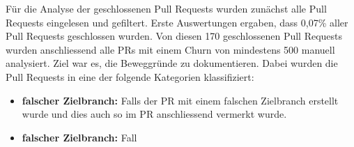 Für die Analyse der geschlossenen Pull Requests wurden zunächst alle Pull Requests eingelesen und gefiltert. Erste Auswertungen ergaben, dass 0,07\% aller Pull Requests geschlossen wurden. Von diesen 170 geschlossenen Pull Requests wurden anschliessend alle PRs mit einem Churn von mindestens 500 manuell analysiert. Ziel war es, die Beweggründe zu dokumentieren. Dabei wurden die Pull Requests in eine der folgende Kategorien klassifiziert:
\begin{itemize}
    \item \textbf{falscher Zielbranch:} Falls der PR mit einem falschen Zielbranch erstellt wurde und dies auch so im PR anschliessend vermerkt wurde. 
    \item \textbf{falscher Zielbranch:} Fall
\end{itemize}